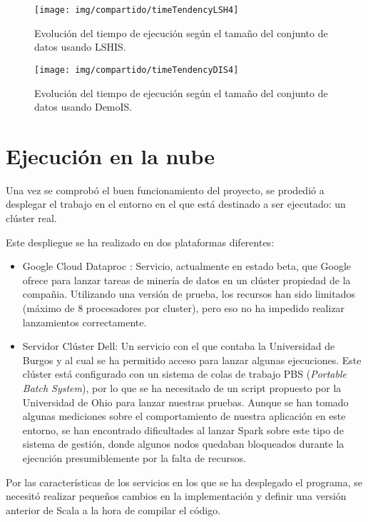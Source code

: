 	\begin{figure}[!h]
		\centering
		\texttt{[image: img/compartido/timeTendencyLSH4]}
		\caption{Evolución del tiempo de ejecución según el tamaño del conjunto de datos usando LSHIS.}\label{fig:img/compartido/timeTendencyLSH4}
	\end{figure}
	
		\begin{figure}[!h]
		\centering
		\texttt{[image: img/compartido/timeTendencyDIS4]}
		\caption{Evolución del tiempo de ejecución según el tamaño del conjunto de datos usando DemoIS.}\label{fig:img/compartido/timeTendencyDIS4}
	\end{figure}
	\FloatBarrier


\section{Ejecución en la nube}\label{sec: ejecucionNube}

Una vez se comprobó el buen funcionamiento del proyecto, se prodedió a desplegar el trabajo en el entorno en el que está destinado a ser ejecutado: un clúster real.

Este despliegue se ha realizado en dos plataformas diferentes:
\begin{itemize}
	\item Google Cloud Dataproc \cite{dataprocSoft}: Servicio, actualmente en estado beta, que Google ofrece para lanzar tareas de minería de datos en un clúster propiedad de la compañia. Utilizando una versión de prueba, los recursos han sido limitados (máximo de 8 procesadores por cluster), pero eso no ha impedido realizar lanzamientos correctamente.  
	\item Servidor Clúster Dell: Un servicio con el que contaba la Universidad de Burgos y al cual se ha permitido acceso para lanzar algunas ejecuciones. Este clúster está configurado con un sistema de colas de trabajo PBS (\textit{Portable Batch System}), por lo que se ha necesitado de un script propuesto por la Universidad de Ohio \cite{baer2015integrating} para lanzar nuestras pruebas. Aunque se han tomado algunas mediciones sobre el comportamiento de nuestra aplicación en este entorno, se han encontrado dificultades al lanzar Spark sobre este tipo de sistema de gestión, donde algunos nodos quedaban bloqueados durante la ejecución presumiblemente por la falta de recursos.
\end{itemize}

Por las características de los servicios en los que se ha desplegado el programa, se necesitó realizar pequeños cambios en la implementación y definir una versión anterior de Scala a la hora de compilar el código.

